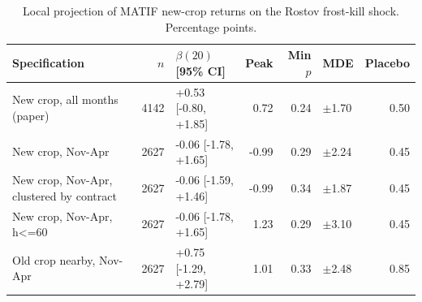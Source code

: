 \begin{table}
\caption{Local projection of MATIF new-crop returns on the Rostov frost-kill shock. Percentage points.}
\label{tab:lp}
\begin{tabular}{lrlrrlr}
\toprule
Specification & $n$ & $\beta(20)$ [95\% CI] & Peak & Min $p$ & MDE & Placebo \\
\midrule
New crop, all months (paper) & 4142 & +0.53 [-0.80, +1.85] & 0.72 & 0.24 & $\pm$1.70 & 0.50 \\
New crop, Nov-Apr & 2627 & -0.06 [-1.78, +1.65] & -0.99 & 0.29 & $\pm$2.24 & 0.45 \\
New crop, Nov-Apr, clustered by contract & 2627 & -0.06 [-1.59, +1.46] & -0.99 & 0.34 & $\pm$1.87 & 0.45 \\
New crop, Nov-Apr, h<=60 & 2627 & -0.06 [-1.78, +1.65] & 1.23 & 0.29 & $\pm$3.10 & 0.45 \\
Old crop nearby, Nov-Apr & 2627 & +0.75 [-1.29, +2.79] & 1.01 & 0.33 & $\pm$2.48 & 0.85 \\
\bottomrule
\end{tabular}
\end{table}
